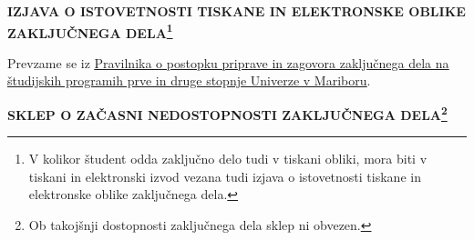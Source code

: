 \documentclass[openany, a4paper, 12pt]{book}
\begin{document}
\newpage
\begin{center}
    \textbf{IZJAVA O ISTOVETNOSTI TISKANE IN ELEKTRONSKE OBLIKE ZAKLJUČNEGA DELA\footnote{V kolikor študent odda zaključno delo tudi v tiskani obliki, mora biti v tiskani in elektronski izvod vezana tudi izjava o istovetnosti tiskane in elektronske oblike zaključnega dela.}}
\end{center}

Prevzame se iz \href{https://www.um.si/univerza/dokumentni-center/akti/GlavniDokumenti2013/Pravilnik\%20o\%20zaklj.\%20delih\%20na\%20\%C5\%A0P\%201.\%20in\%202.\%20st.\%20UM\%20(UPB\%201).pdf}{\ul{Pravilnika o postopku priprave in zagovora zaključnega dela na študijskih programih prve in druge stopnje Univerze v Mariboru}}.

\newpage
\begin{center}
    \textbf{SKLEP O ZAČASNI NEDOSTOPNOSTI ZAKLJUČNEGA DELA\footnote{Ob takojšnji dostopnosti zaključnega dela sklep ni obvezen.}}
\end{center}
\newpage
\let\cleardoublepage\clearpage
\tableofcontents

\newpage
\let\cleardoublepage\clearpage
{
\let\oldnumberline\numberline
\renewcommand{\numberline}{\figurename~\oldnumberline}
\renewcommand{\cftfigaftersnum}{: }
\listoffigures
}

\newpage
\let\cleardoublepage\clearpage
{
\let\oldnumberline\numberline
\renewcommand{\numberline}{\tablename~\oldnumberline}
\renewcommand{\cfttabaftersnum}{: }
\listoftables
}

\newpage
\let\cleardoublepage\clearpage
{
\listofalgorithms
}
\end{document}
